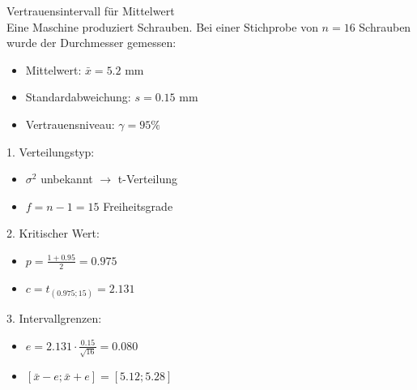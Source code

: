 \begin{example2}{Vertrauensintervall für Mittelwert}\\
Eine Maschine produziert Schrauben. Bei einer Stichprobe von $n=16$ Schrauben wurde der Durchmesser gemessen:
\begin{itemize}
  \item Mittelwert: $\bar{x} = 5.2$ mm
  \item Standardabweichung: $s = 0.15$ mm
  \item Vertrauensniveau: $\gamma = 95\%$
\end{itemize}

1. Verteilungstyp:
   \begin{itemize}
     \item $\sigma^2$ unbekannt $\rightarrow$ t-Verteilung
     \item $f = n-1 = 15$ Freiheitsgrade
   \end{itemize}

2. Kritischer Wert:
   \begin{itemize}
     \item $p = \frac{1+0.95}{2} = 0.975$
     \item $c = t_{(0.975;15)} = 2.131$
   \end{itemize}

3. Intervallgrenzen:
   \begin{itemize}
     \item $e = 2.131 \cdot \frac{0.15}{\sqrt{16}} = 0.080$
     \item $[\bar{x} - e; \bar{x} + e] = [5.12; 5.28]$
   \end{itemize}
\end{example2}

